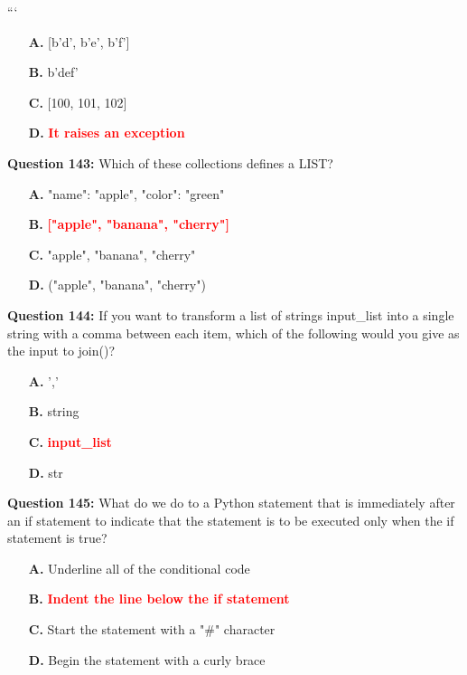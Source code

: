 \documentclass[12pt,a4paper]{article}
\begin{document}
\newline
```

\begin{itemize}
    \item[\textbf{A.}] [b'd', b'e', b'f']
    \item[\textbf{B.}] b'def'
    \item[\textbf{C.}] [100, 101, 102]
    \item[\textbf{D.}] \textcolor{red}{\textbf{It raises an exception}}
\end{itemize}

\vspace{0.5cm}

\textbf{Question 143:} Which of these collections defines a LIST?

\begin{itemize}
    \item[\textbf{A.}] "name": "apple", "color": "green"
    \item[\textbf{B.}] \textcolor{red}{\textbf{["apple", "banana", "cherry"]}}
    \item[\textbf{C.}] "apple", "banana", "cherry"
    \item[\textbf{D.}] ("apple", "banana", "cherry")
\end{itemize}

\vspace{0.5cm}

\textbf{Question 144:} If you want to transform a list of strings input_list into a single string with a comma between each item, which of the following would you give as the input to join()?

\begin{itemize}
    \item[\textbf{A.}] ','
    \item[\textbf{B.}] string
    \item[\textbf{C.}] \textcolor{red}{\textbf{input_list}}
    \item[\textbf{D.}] str
\end{itemize}

\vspace{0.5cm}

\textbf{Question 145:} What do we do to a Python statement that is immediately after an if statement to indicate that the statement is to be executed only when the if statement is true?

\begin{itemize}
    \item[\textbf{A.}] Underline all of the conditional code
    \item[\textbf{B.}] \textcolor{red}{\textbf{Indent the line below the if statement}}
    \item[\textbf{C.}] Start the statement with a "#" character
    \item[\textbf{D.}] Begin the statement with a curly brace
\end{itemize}
\end{document}
